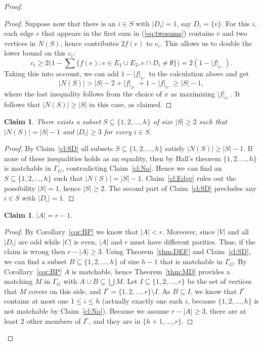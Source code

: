 \documentclass[10pt,a4paper]{amsart}
\newtheorem{claim}[theorem]{Claim}
\begin{document}
\begin{proof}
\begin{proof}
Suppose now that there is an $i \in S$ with $|D_i| = 1$, say $D_i = \{v\}$. For this $i$, each edge $e$ that appears in the first sum in (\ref{eq:twosums}) contains $v$ and two vertices in $N(S)$, hence contributes $2f(e)$ to $c_i$. This allows us to double the lower bound on this $c_i$: \[ c_i \ge 2 \bigl( 1 - \sum \{ f(e): e \in E_1 \cup E_2, e \cap D_i \ne \emptyset \}\bigr) = 2 (1 - |f|_{v^-}).\] Taking this into account, we can add $1 - |f|_{v^-}$ to the calculation above and get \[ |N(S)| > |S| - 2 + |f|_{x^-} + 1 - |f|_{v^-} \ge |S| - 1,\] where the last inequality follows from the choice of $x$ as maximizing $|f|_{v^-}$. It follows that $|N(S)| \ge |S|$ in this case, as claimed.
\end{proof}
\begin{claim} \label{cl:One}
There exists a subset $S \subseteq \{1,2, \ldots , h\}$ of size $|S| \ge 2$ such that $|N(S)| = |S| - 1$ and $|D_i| \ge 3$ for every $i \in S$.
\end{claim}
\begin{proof} By Claim~\ref{cl:SD} all subsets $S \subseteq \{1,2, \ldots , h\}$ satisfy $|N(S)| \ge |S| - 1$. If none of these inequalities holds as an equality, then by Hall's theorem $\{1,2, \ldots , h\}$ is matchable in $\Gamma_G$, contradicting Claim~\ref{cl:No}. Hence we can find an $S \subseteq \{1,2, \ldots , h\}$ such that $|N(S)| = |S| - 1$. Claim~\ref{cl:Edge} rules out the possibility $|S| = 1$, hence $|S| \ge 2$. The second part of Claim~\ref{cl:SD} precludes any $i \in S$ with $|D_i| = 1$.
\end{proof}
\begin{claim} \label{cl:Ar}
$|A| = r - 1.$
\end{claim}
\begin{proof} By Corollary~\ref{cor:BP} we know that $|A| < r$. Moreover, since $|V|$ and all $|D_i|$ are odd while $|C|$ is even, $|A|$ and $r$ must have different parities. Thus, if the claim is wrong then $r - |A| \ge 3$. Using Theorem~\ref{thm:DEF} and Claim~\ref{cl:SD}, we can find a subset $B \subseteq \{1,2, \ldots , h\}$ of size $h-1$ that is matchable in $\Gamma_G$. By Corollary~\ref{cor:BP} $A$ is matchable, hence Theorem~\ref{thm:MD} provides a matching $M$ in $\Gamma_G$ with $A \cup B \subseteq \bigcup M$. Let $I \subseteq \{1,2, \ldots , r\}$ be the set of vertices that $M$ covers on this side, and $I^c = \{1,2, \ldots , r\} \setminus I$. As $B \subseteq I$, we know that $I^c$ contains at most one $1 \le i \le h$ (actually exactly one such $i$, because $\{1,2, \ldots , h\}$ is not matchable by Claim~\ref{cl:No}). Because we assume $r - |A| \ge 3$, there are at least $2$ other members of $I^c$, and they are in $\{h+1, \ldots , r\}$.


\end{proof}
\end{proof}
\end{document}
